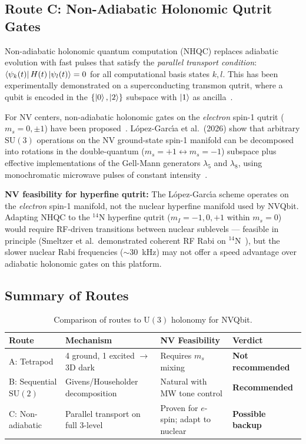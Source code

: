 \documentclass[11pt,letterpaper]{article}
\newcommand{\SU}{\mathrm{SU}}
\newcommand{\UU}{\mathrm{U}}
\begin{document}
\subsection{Route C: Non-Adiabatic Holonomic Qutrit Gates}
\label{sec:nonadiabatic}

Non-adiabatic holonomic quantum computation (NHQC) replaces adiabatic evolution with
fast pulses that satisfy the \emph{parallel transport condition}: $\bra{\psi_k(t)}
H(t) \ket{\psi_l(t)} = 0$ for all computational basis states $k, l$. This has been
experimentally demonstrated on a superconducting transmon qutrit, where a qubit is
encoded in the $\{\ket{0}, \ket{2}\}$ subspace with $\ket{1}$ as
ancilla~\cite{Abdumalikov2013,Zhang2019}.

For NV centers, non-adiabatic holonomic gates on the \emph{electron} spin-1 qutrit
($m_s = 0, \pm 1$) have been proposed~\cite{LopezGarcia2026}. L\'{o}pez-Garc\'{\i}a
et al.\ (2026) show that arbitrary $\SU(3)$ operations on the NV ground-state spin-1
manifold can be decomposed into rotations in the double-quantum ($m_s = +1 \leftrightarrow
m_s = -1$) subspace plus effective implementations of the Gell-Mann generators $\lambda_5$
and $\lambda_8$, using monochromatic microwave pulses of constant
intensity~\cite{LopezGarcia2026}.

\textbf{NV feasibility for hyperfine qutrit:} The L\'{o}pez-Garc\'{\i}a scheme operates
on the \emph{electron} spin-1 manifold, not the nuclear hyperfine manifold used by NVQbit.
Adapting NHQC to the $^{14}$N hyperfine qutrit ($m_I = -1, 0, +1$ within $m_s = 0$)
would require RF-driven transitions between nuclear sublevels --- feasible in principle
(Smeltzer et al.\ demonstrated coherent RF Rabi on $^{14}$N~\cite{Smeltzer2009}), but
the slower nuclear Rabi frequencies ($\sim 30$~kHz) %
may not offer a speed advantage over adiabatic holonomic gates on this platform.

\subsection{Summary of Routes}

\begin{table}[h]
\centering
\caption{Comparison of routes to $\UU(3)$ holonomy for NVQbit.}
\label{tab:routes}
\begin{tabular}{@{}llll@{}}
\toprule
\textbf{Route} & \textbf{Mechanism} & \textbf{NV Feasibility} & \textbf{Verdict} \\
\midrule
A: Tetrapod & 4 ground, 1 excited $\to$ 3D dark & Requires $m_s$ mixing & \textbf{Not recommended} \\
B: Sequential $\SU(2)$ & Givens/Householder decomposition & Natural with MW tone control & \textbf{Recommended} \\
C: Non-adiabatic & Parallel transport on full 3-level & Proven for $e$-spin; adapt to nuclear & \textbf{Possible backup} \\
\bottomrule
\end{tabular}
\end{table}
\end{document}
